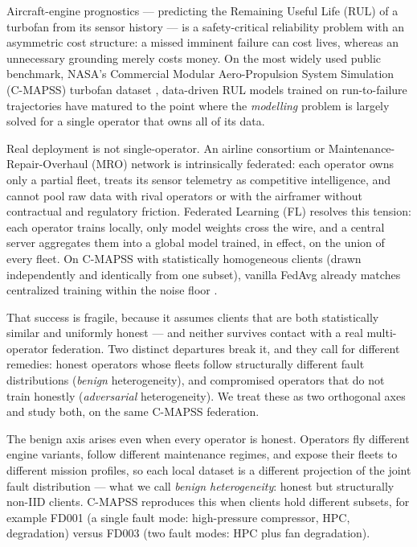 \documentclass[a4paper,fleqn,doubleblind]{cas-sc}
\begin{document}
Aircraft-engine prognostics --- predicting the Remaining Useful Life
(RUL) of a turbofan from its sensor history --- is a safety-critical
reliability problem with an asymmetric cost structure: a missed
imminent failure can cost lives, whereas an unnecessary grounding
merely costs money. On the most widely used public benchmark, NASA's
Commercial Modular Aero-Propulsion System Simulation (C-MAPSS)
turbofan dataset \citep{Saxena2008CMAPSS}, data-driven RUL models
trained on run-to-failure trajectories have matured to the point
where the \emph{modelling} problem is largely solved for a single
operator that owns all of its data.

Real deployment is not single-operator. An airline consortium or
Maintenance-Repair-Overhaul (MRO) network is intrinsically
federated: each operator owns only a partial fleet, treats its
sensor telemetry as competitive intelligence, and cannot pool raw
data with rival operators or with the airframer without contractual
and regulatory friction. Federated Learning (FL)
\citep{McMahan2017FedAvg} resolves this tension: each operator trains
locally, only model weights cross the wire, and a central server
aggregates them into a global model trained, in effect, on the union
of every fleet. On C-MAPSS with statistically homogeneous clients
(drawn independently and identically from one subset), vanilla
FedAvg already matches centralized training within the noise floor
\citep{Barbosa2025FLJetEngines,Vermelin2024CollabFLRUL,%
Pandhare2021FederatedBaseline}.

That success is fragile, because it assumes clients that are both
statistically similar and uniformly honest --- and neither survives
contact with a real multi-operator federation. Two distinct
departures break it, and they call for different remedies: honest
operators whose fleets follow structurally different fault
distributions (\emph{benign} heterogeneity), and compromised
operators that do not train honestly (\emph{adversarial}
heterogeneity). We treat these as two orthogonal axes and study
both, on the same C-MAPSS federation.

The benign axis arises even when every operator is honest. Operators
fly different engine variants, follow different maintenance regimes,
and expose their fleets to different mission profiles, so each local
dataset is a different projection of the joint fault distribution ---
what we call \emph{benign heterogeneity}: honest but structurally
non-IID clients. C-MAPSS reproduces this when clients hold different
subsets, for example FD001 (a single fault mode: high-pressure
compressor, HPC, degradation) versus FD003 (two fault modes: HPC
plus fan degradation).
\end{document}
